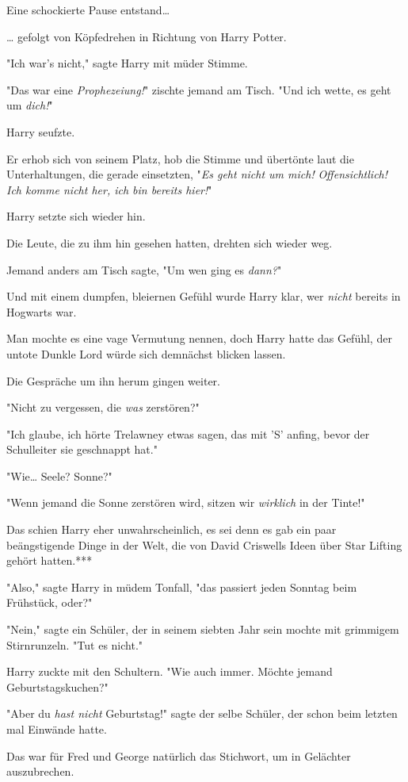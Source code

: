 {Eine schockierte Pause entstand…

… gefolgt von Köpfedrehen in Richtung von Harry Potter.

"Ich war's nicht," sagte Harry mit müder Stimme.

"Das war eine \emph{Prophezeiung!}" zischte jemand am Tisch. "Und ich wette, es geht um \emph{dich!}"

Harry seufzte.

Er erhob sich von seinem Platz, hob die Stimme und übertönte laut die Unterhaltungen, die gerade einsetzten, "\emph{Es geht nicht um mich!} \emph{Offensichtlich! Ich komme nicht her, ich bin bereits hier!}"

Harry setzte sich wieder hin.

Die Leute, die zu ihm hin gesehen hatten, drehten sich wieder weg.

Jemand anders am Tisch sagte, "Um wen ging es \emph{dann?}"

Und mit einem dumpfen, bleiernen Gefühl wurde Harry klar, wer \emph{nicht} bereits in Hogwarts war.

Man mochte es eine vage Vermutung nennen, doch Harry hatte das Gefühl, der untote Dunkle Lord würde sich demnächst blicken lassen.

Die Gespräche um ihn herum gingen weiter.

"Nicht zu vergessen, die \emph{was} zerstören?"

"Ich glaube, ich hörte Trelawney etwas sagen, das mit 'S' anfing, bevor der Schulleiter sie geschnappt hat."

"Wie… Seele? Sonne?"

"Wenn jemand die Sonne zerstören wird, sitzen wir \emph{wirklich} in der Tinte!"

Das schien Harry eher unwahrscheinlich, es sei denn es gab ein paar beängstigende Dinge in der Welt, die von David Criswells Ideen über Star Lifting gehört hatten.***

"Also," sagte Harry in müdem Tonfall, "das passiert jeden Sonntag beim Frühstück, oder?"

"Nein," sagte ein Schüler, der in seinem siebten Jahr sein mochte mit grimmigem Stirnrunzeln. "Tut es nicht."

Harry zuckte mit den Schultern. "Wie auch immer. Möchte jemand Geburtstagskuchen?"

"Aber du \emph{hast nicht} Geburtstag!" sagte der selbe Schüler, der schon beim letzten mal Einwände hatte.

Das war für Fred und George natürlich das Stichwort, um in Gelächter auszubrechen.

}
